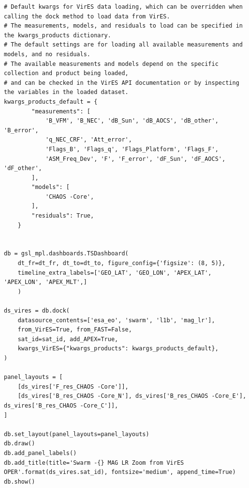 \begin{verbatim}
# Default kwargs for VirES data loading, which can be overridden when calling the dock method to load data from VirES. 
# The measurements, models, and residuals to load can be specified in the kwargs_products dictionary. 
# The default settings are for loading all available measurements and models, and no residuals. 
# The available measurements and models depend on the specific collection and product being loaded, 
# and can be checked in the VirES API documentation or by inspecting the variables in the loaded dataset.
kwargs_products_default = {
        "measurements": [
            'B_VFM', 'B_NEC', 'dB_Sun', 'dB_AOCS', 'dB_other', 'B_error',
            'q_NEC_CRF', 'Att_error',
            'Flags_B', 'Flags_q', 'Flags_Platform', 'Flags_F',
            'ASM_Freq_Dev', 'F', 'F_error', 'dF_Sun', 'dF_AOCS', 'dF_other',
        ],
        "models": [
            'CHAOS -Core',
        ],
        "residuals": True,
    }


db = gsl_mpl.dashboards.TSDashboard(
    dt_fr=dt_fr, dt_to=dt_to, figure_config={'figsize': (8, 5)},
    timeline_extra_labels=['GEO_LAT', 'GEO_LON', 'APEX_LAT', 'APEX_LON', 'APEX_MLT',] 
    )

ds_vires = db.dock(
    datasource_contents=['esa_eo', 'swarm', 'l1b', 'mag_lr'], 
    from_VirES=True, from_FAST=False,
    sat_id=sat_id, add_APEX=True,
    kwargs_VirES={"kwargs_products": kwargs_products_default},
)

panel_layouts = [
    [ds_vires['F_res_CHAOS -Core']],
    [ds_vires['B_res_CHAOS -Core_N'], ds_vires['B_res_CHAOS -Core_E'], ds_vires['B_res_CHAOS -Core_C']],
]

db.set_layout(panel_layouts=panel_layouts)
db.draw()
db.add_panel_labels()
db.add_title(title='Swarm -{} MAG LR Zoom from VirES OPER'.format(ds_vires.sat_id), fontsize='medium', append_time=True)
db.show()
\end{verbatim}


